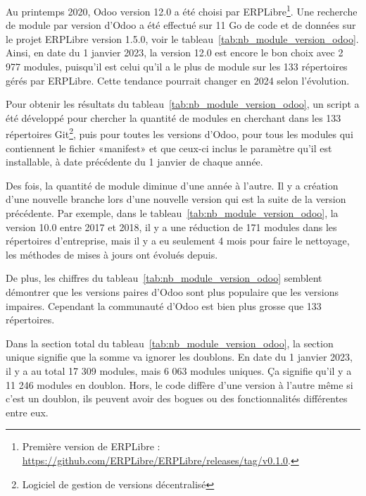 Au printemps 2020, Odoo version 12.0 a été choisi par ERPLibre\footnote{Première version de ERPLibre : \url{https://github.com/ERPLibre/ERPLibre/releases/tag/v0.1.0}.}. Une recherche de module par version d'Odoo a été effectué sur 11 Go de code et de données sur le projet ERPLibre version 1.5.0, voir le tableau~\ref{tab:nb_module_version_odoo}. Ainsi, en date du 1 janvier 2023, la version 12.0 est encore le bon choix avec 2 977 modules, puisqu'il est celui qu'il a le plus de module sur les 133 répertoires gérés par ERPLibre. Cette tendance pourrait changer en 2024 selon l’évolution.

Pour obtenir les résultats du tableau~\ref{tab:nb_module_version_odoo}, un script a été développé pour chercher la quantité de modules en cherchant dans les 133 répertoires Git\footnote{Logiciel de gestion de versions décentralisé}, puis pour toutes les versions d'Odoo, pour tous les modules qui contiennent le fichier «manifest» et que ceux-ci inclus le paramètre qu'il est installable, à date précédente du 1 janvier de chaque année.

Des fois, la quantité de module diminue d'une année à l'autre. Il y a création d'une nouvelle branche lors d'une nouvelle version qui est la suite de la version précédente. Par exemple, dans le tableau~\ref{tab:nb_module_version_odoo}, la version 10.0 entre 2017 et 2018, il y a une réduction de 171 modules dans les répertoires d'entreprise, mais il y a eu seulement 4 mois pour faire le nettoyage, les méthodes de mises à jours ont évolués depuis.

De plus, les chiffres du tableau~\ref{tab:nb_module_version_odoo} semblent démontrer que les versions paires d'Odoo sont plus populaire que les versions impaires. Cependant la communauté d'Odoo est bien plus grosse que 133 répertoires.

Dans la section total du tableau~\ref{tab:nb_module_version_odoo}, la section unique signifie que la somme va ignorer les doublons. En date du 1 janvier 2023, il y a au total 17 309 modules, mais 6 063 modules uniques. Ça signifie qu'il y a 11 246 modules en doublon. Hors, le code diffère d'une version à l'autre même si c'est un doublon, ils peuvent avoir des bogues ou des fonctionnalités différentes entre eux.

